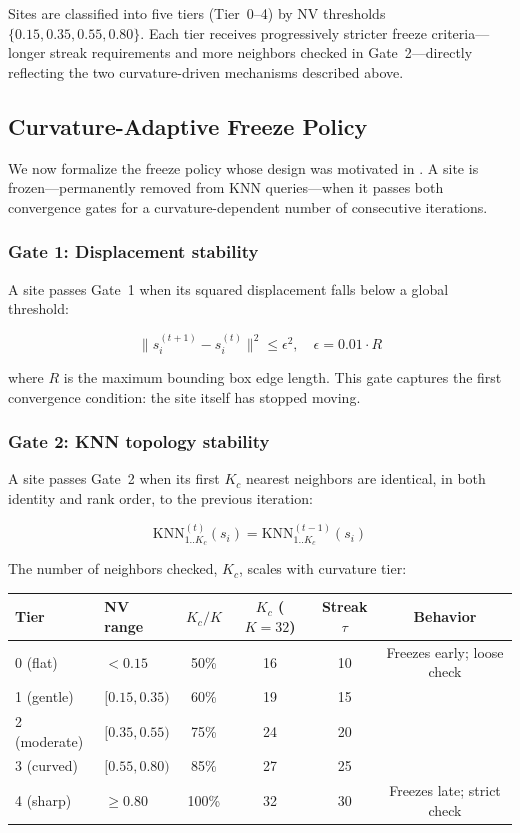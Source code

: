 Sites are classified into five tiers (Tier~0--4) by NV thresholds $\{0.15, 0.35, 0.55, 0.80\}$. Each tier receives progressively stricter freeze criteria---longer streak requirements and more neighbors checked in Gate~2---directly reflecting the two curvature-driven mechanisms described above.

\subsection{Curvature-Adaptive Freeze Policy}
\label{sec:freeze_policy}

We now formalize the freeze policy whose design was motivated in . A site is frozen---permanently removed from KNN queries---when it passes both convergence gates for a curvature-dependent number of consecutive iterations.

\subsubsection{Gate 1: Displacement stability}

A site passes Gate~1 when its squared displacement falls below a global threshold:

$$\|s_i^{(t+1)} - s_i^{(t)}\|^2 \leq \epsilon^2, \quad \epsilon = 0.01 \cdot R$$

where $R$ is the maximum bounding box edge length. This gate captures the first convergence condition: the site itself has stopped moving.

\subsubsection{Gate 2: KNN topology stability}

A site passes Gate~2 when its first $K_c$ nearest neighbors are identical, in both identity and rank order, to the previous iteration:

$$\mathrm{KNN}^{(t)}_{1..K_c}(s_i) = \mathrm{KNN}^{(t-1)}_{1..K_c}(s_i)$$

The number of neighbors checked, $K_c$, scales with curvature tier:

\begin{table}[h]
    \centering
    \begin{tabular}{llcccc}
        \hline
        Tier & NV range & $K_c / K$ & $K_c$ ($K{=}32$) & Streak $\tau$ & Behavior \\
        \hline
        0 (flat) & $< 0.15$ & 50\% & 16 & 10 & Freezes early; loose check \\
        1 (gentle) & $[0.15, 0.35)$ & 60\% & 19 & 15 & \\
        2 (moderate) & $[0.35, 0.55)$ & 75\% & 24 & 20 & \\
        3 (curved) & $[0.55, 0.80)$ & 85\% & 27 & 25 & \\
        4 (sharp) & $\geq 0.80$ & 100\% & 32 & 30 & Freezes late; strict check \\
        \hline
    \end{tabular}
\end{table}

